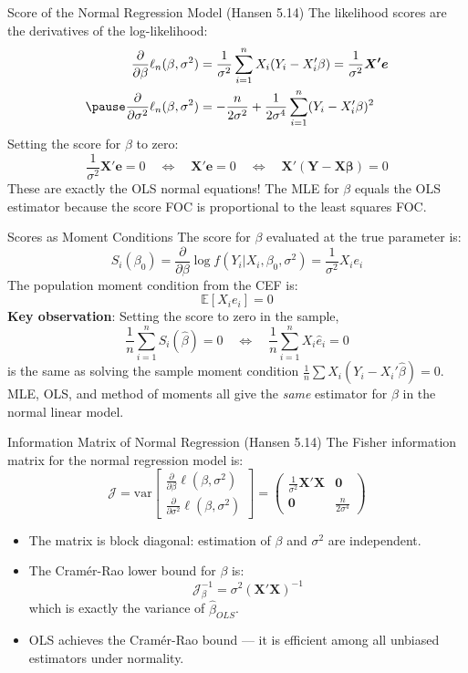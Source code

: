 \documentclass[aspectratio=169, handout, t]{beamer}
\numberwithin{equation}{section}
\begin{document}
\begin{frame}{Score of the Normal Regression Model (Hansen 5.14)}
The likelihood scores are the derivatives of the log-likelihood:
\begin{align*}
\frac{\partial}{\partial \beta}\ell_n(\beta,\sigma^2)&=\frac{1}{\sigma^2}\sum_{i=1}^n X_i(Y_i-X_i'\beta)=\frac{1}{\sigma^2}\bm{X'e}\\\pause
\frac{\partial}{\partial \sigma^2}\ell_n(\beta,\sigma^2)&=-\frac{n}{2\sigma^2}+\frac{1}{2\sigma^4}\sum_{i=1}^n(Y_i-X_i'\beta)^2
\end{align*}\pause
Setting the score for $\beta$ to zero:
$$\frac{1}{\sigma^2}\bm{X'e}=0 \quad\Longleftrightarrow\quad \bm{X'e}=0 \quad\Longleftrightarrow\quad \bm{X'(Y-X\beta)}=0$$\pause
\medskip
These are exactly the \alert{OLS normal equations}!  The MLE for $\beta$ equals the OLS estimator because the score FOC is proportional to the least squares FOC.
\end{frame}

\begin{frame}{Scores as Moment Conditions}
The score for $\beta$ evaluated at the true parameter is:
$$S_i(\beta_0)=\frac{\partial}{\partial \beta}\log f(Y_i|X_i,\beta_0,\sigma^2)=\frac{1}{\sigma^2}X_i e_i$$\pause
The population moment condition from the CEF is:
$$\mathbb{E}[X_i e_i]=0$$\pause
\medskip
\textbf{Key observation}: Setting the score to zero in the sample,
$$\frac{1}{n}\sum_{i=1}^n S_i(\hat{\beta})=0 \quad\Longleftrightarrow\quad \frac{1}{n}\sum_{i=1}^n X_i\hat{e}_i=0$$
is the \alert{same} as solving the sample moment condition $\frac{1}{n}\sum X_i(Y_i - X_i'\hat{\beta})=0$.\\\pause
\medskip
MLE, OLS, and method of moments all give the \emph{same} estimator for $\beta$ in the normal linear model.
\end{frame}

\begin{frame}{Information Matrix of Normal Regression (Hansen 5.14)}
The Fisher information matrix for the normal regression model is:
$$\mathcal{J}=\text{var}\begin{bmatrix}\frac{\partial}{\partial \beta}\ell(\beta,\sigma^2)\\\frac{\partial}{\partial \sigma^2}\ell(\beta,\sigma^2)\end{bmatrix}=\begin{pmatrix}\frac{1}{\sigma^2}\bm{X'X} & \bm{0}\\\bm{0} & \frac{n}{2\sigma^4}\end{pmatrix}$$\pause
\begin{itemize}
\item The matrix is \alert{block diagonal}: estimation of $\beta$ and $\sigma^2$ are independent.
\item The Cram\'{e}r-Rao lower bound for $\beta$ is:
$$\mathcal{J}_\beta^{-1}=\sigma^2(\bm{X'X})^{-1}$$
which is exactly the variance of $\hat{\beta}_{OLS}$.\pause
\item OLS \alert{achieves the Cram\'{e}r-Rao bound} --- it is efficient among all unbiased estimators under normality.
\end{itemize}
\end{frame}
\end{document}

